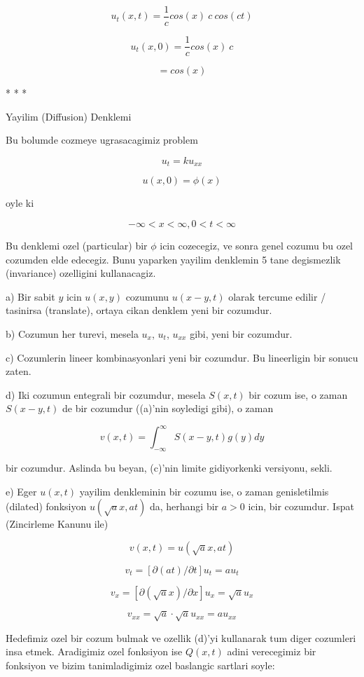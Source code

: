 \documentclass[12pt,fleqn]{article}
\begin{document}
\[ u_t(x,t) = \frac{1}{c}cos(x) \ c \ cos(ct) \]

\[ u_t(x,0) = \frac{1}{c}cos(x) \ c \]

\[  = cos(x) \]


* * * 


Yayilim (Diffusion) Denklemi

Bu bolumde cozmeye ugrasacagimiz problem

\[  u_t = k u_{xx}  \]

\[ u(x,0) = \phi(x) \]

oyle ki 

\[ -\infty < x < \infty, 0 < t < \infty \]

Bu denklemi ozel (particular) bir $\phi$ icin cozecegiz, ve sonra genel
cozumu bu ozel cozumden elde edecegiz. Bunu yaparken yayilim denklemin 5
tane degismezlik (invariance) ozelligini kullanacagiz.

a) Bir sabit $y$ icin $u(x,y)$ cozumunu $u(x-y,t)$ olarak tercume edilir /
tasinirsa (translate), ortaya cikan denklem yeni bir cozumdur.

b) Cozumun her turevi, mesela $u_x$, $u_t$, $u_{xx}$ gibi, yeni bir
cozumdur. 

c) Cozumlerin lineer kombinasyonlari yeni bir cozumdur. Bu lineerligin bir
sonucu zaten.

d) Iki cozumun entegrali bir cozumdur, mesela $S(x,t)$ bir cozum ise, o
zaman $S(x-y,t)$ de bir cozumdur ((a)'nin soyledigi gibi), o zaman

\[ v(x,t) = \int_{-\infty}^{\infty}S(x-y,t)g(y) dy   \]

bir cozumdur. Aslinda bu beyan, (c)'nin limite gidiyorkenki versiyonu,
sekli.

e) Eger $u(x,t)$ yayilim denkleminin bir cozumu ise, o zaman genisletilmis
(dilated) fonksiyon $u(\sqrt{a} x, at)$ da, herhangi bir $a>0$ icin, bir
cozumdur. Ispat (Zincirleme Kanunu ile)

\[ v(x,t) =  u(\sqrt{a} x, at) \]

\[ v_t = [\partial(at) / \partial t]u_t = au_t \]

\[ v_x = [\partial(\sqrt{a}x) / \partial x]u_x = \sqrt{a}u_x \]

\[ v_{xx} = \sqrt{a} \cdot \sqrt{a} u_{xx} = a u_{xx} \]

Hedefimiz ozel bir cozum bulmak ve ozellik (d)'yi kullanarak tum diger
cozumleri insa etmek. Aradigimiz ozel fonksiyon ise $Q(x,t)$ adini
verecegimiz  bir fonksiyon ve bizim tanimladigimiz ozel baslangic
sartlari soyle:
\end{document}
